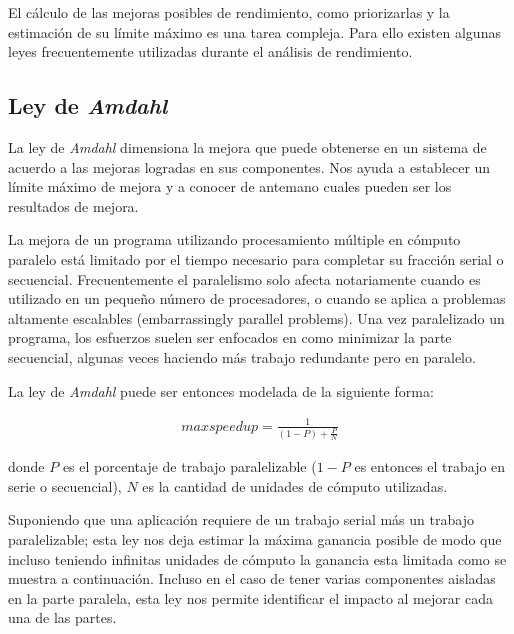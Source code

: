 \documentclass[a4paper]{report}
\begin{document}
\bigskip

El c\'alculo de las mejoras posibles de rendimiento, como priorizarlas y la estimaci\'on de su l\'imite m\'aximo es una tarea compleja.
Para ello existen algunas leyes frecuentemente utilizadas durante el an\'alisis de rendimiento.

\subsection{Ley de {\it Amdahl}}

 La ley de {\it Amdahl} \cite{amdahl} dimensiona la mejora que puede obtenerse en un sistema de acuerdo a las mejoras logradas en sus
componentes. Nos ayuda a establecer un l\'imite m\'aximo de mejora y a conocer de antemano cuales pueden ser los resultados de mejora.

\bigskip

La mejora de un programa utilizando procesamiento m\'ultiple en c\'omputo paralelo
est\'a limitado por el tiempo necesario para completar su fracci\'on serial o
secuencial. Frecuentemente el paralelismo solo afecta notariamente cuando es
utilizado en un peque\~no n\'umero de procesadores, o cuando se aplica a problemas
altamente escalables (embarrassingly parallel problems). Una vez paralelizado un
programa, los esfuerzos suelen ser enfocados en como minimizar
la parte secuencial, algunas veces haciendo m\'as trabajo redundante pero en paralelo.

\bigskip

La ley de {\it Amdahl} puede ser entonces modelada de la siguiente forma:

\begin{eqnarray}
max speedup = \frac{1}{(1-P) + \frac{P}{N}}
\end{eqnarray}

donde $ P $ es el porcentaje de trabajo paralelizable ($ 1-P $ es entonces el trabajo en serie o secuencial), $ N $ es la cantidad de unidades de c\'omputo utilizadas.

\bigskip

Suponiendo que una aplicaci\'on requiere de un trabajo serial m\'as un trabajo paralelizable; esta ley nos deja estimar la m\'axima ganancia posible
de modo que incluso teniendo infinitas unidades de c\'omputo la ganancia esta limitada como se muestra a continuaci\'on. Incluso en el caso de tener varias
componentes aisladas en la parte paralela, esta ley nos permite identificar el impacto al mejorar cada una de las partes.
\end{document}
